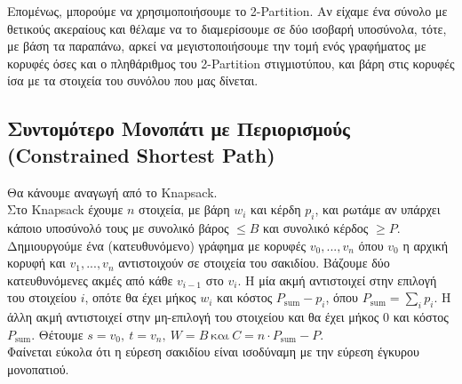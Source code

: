 		Επομένως, μπορούμε να χρησιμοποιήσουμε το 2-Partition. Αν είχαμε ένα σύνολο με θετικούς ακεραίους και θέλαμε να το διαμερίσουμε σε δύο ισοβαρή υποσύνολα, τότε, με βάση τα παραπάνω, αρκεί να μεγιστοποιήσουμε την τομή ενός γραφήματος με κορυφές όσες και ο πληθάριθμος του 2-Partition στιγμιοτύπου, και βάρη στις κορυφές ίσα με τα στοιχεία του συνόλου που μας δίνεται.
	
	\subsection*{Συντομότερο Μονοπάτι με Περιορισμούς (Constrained Shortest Path)}
		Θα κάνουμε αναγωγή από το Knapsack. \\
		
		Στο Knapsack έχουμε $n$ στοιχεία, με βάρη $w_i$ και κέρδη $p_i$, και ρωτάμε αν υπάρχει κάποιο υποσύνολό τους με συνολικό βάρος $\leq B$ και συνολικό κέρδος $\geq P$. \\ 
		
		Δημιουργούμε ένα (κατευθυνόμενο) γράφημα με κορυφές $v_0, ..., v_n$ όπου $v_0$ η αρχική κορυφή και $v_1, ..., v_n$ αντιστοιχούν σε στοιχεία του σακιδίου. Βάζουμε δύο κατευθυνόμενες ακμές από κάθε $v_{i-1}$ στο $v_i$. Η μία ακμή αντιστοιχεί στην επιλογή του στοιχείου $i$, οπότε θα έχει μήκος $w_i$ και κόστος $P_{\text{sum}} - p_i$, όπου $P_{\text{sum}} = \sum_{i} p_i$. Η άλλη ακμή αντιστοιχεί στην μη-επιλογή του στοιχείου και θα έχει μήκος 0 και κόστος $P_{\text{sum}}$. Θέτουμε $s = v_0, \ t=v_n, \ W=B \ \text{και} \ C=n\cdot P_{\text{sum}} - P$. \\
		
		Φαίνεται εύκολα ότι η εύρεση σακιδίου είναι ισοδύναμη με την εύρεση έγκυρου μονοπατιού.  
